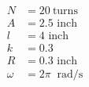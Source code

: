 \documentclass[preview]{standalone}
\begin{document}
\begin{align*}
\begin{aligned}N &= 20\ \text{turns} \\A &= 2.5\text{ inch} \\l &= 4\text{ inch} \\k &= 0.3 \\R &= 0.3\text{ inch} \\\omega &= 2\pi\ \text{ rad/s}\end{aligned}
\end{align*}
\end{document}
